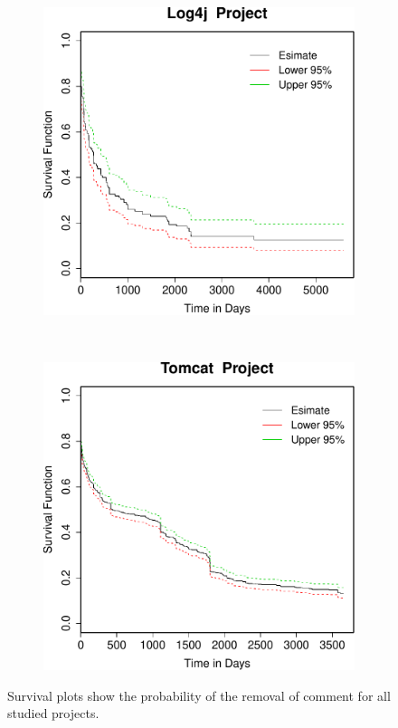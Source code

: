 \begin{figure}[t]
	
	\begin{subfigure}[b]{0.31\textwidth}
		\includegraphics[width=\textwidth]{figures/Survival/log4j.pdf}
	\end{subfigure}
	~
	~
	\begin{subfigure}[b]{0.31\textwidth}
		\includegraphics[width=\textwidth]{figures/Survival/tomcat.pdf}
	\end{subfigure}
	\caption{Survival plots show the probability of the removal of \SATD comment for all studied projects.}
	\label{fig:survival_plots}
\end{figure}


